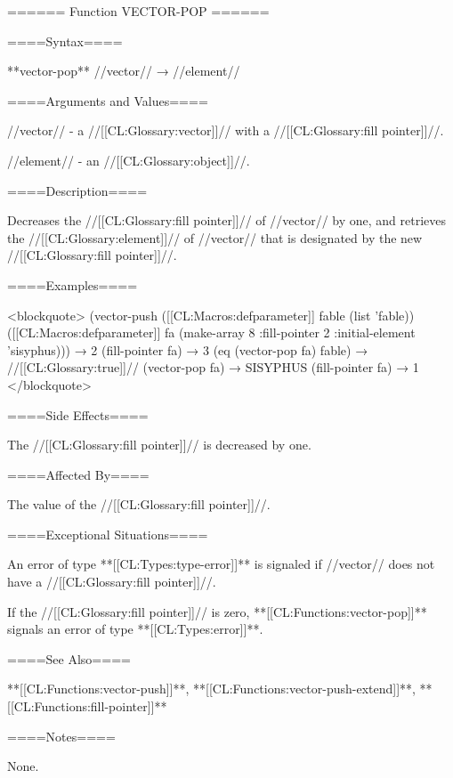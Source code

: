 ====== Function VECTOR-POP ======

====Syntax====

**vector-pop** //vector// → //element//

====Arguments and Values====

//vector// - a //[[CL:Glossary:vector]]// with a //[[CL:Glossary:fill pointer]]//.

//element// - an //[[CL:Glossary:object]]//.

====Description====

Decreases the //[[CL:Glossary:fill pointer]]// of //vector// by one, and retrieves the //[[CL:Glossary:element]]// of //vector// that is designated by the new //[[CL:Glossary:fill pointer]]//.

====Examples====

<blockquote> (vector-push ([[CL:Macros:defparameter]] fable (list 'fable)) ([[CL:Macros:defparameter]] fa (make-array 8 :fill-pointer 2 :initial-element 'sisyphus))) → 2 (fill-pointer fa) → 3 (eq (vector-pop fa) fable) → //[[CL:Glossary:true]]// (vector-pop fa) → SISYPHUS (fill-pointer fa) → 1 </blockquote>

====Side Effects====

The //[[CL:Glossary:fill pointer]]// is decreased by one.

====Affected By====

The value of the //[[CL:Glossary:fill pointer]]//.

====Exceptional Situations====

An error of type **[[CL:Types:type-error]]** is signaled if //vector// does not have a //[[CL:Glossary:fill pointer]]//.

If the //[[CL:Glossary:fill pointer]]// is zero, **[[CL:Functions:vector-pop]]** signals an error of type **[[CL:Types:error]]**.

====See Also====

**[[CL:Functions:vector-push]]**, **[[CL:Functions:vector-push-extend]]**, **[[CL:Functions:fill-pointer]]**

====Notes====

None.

